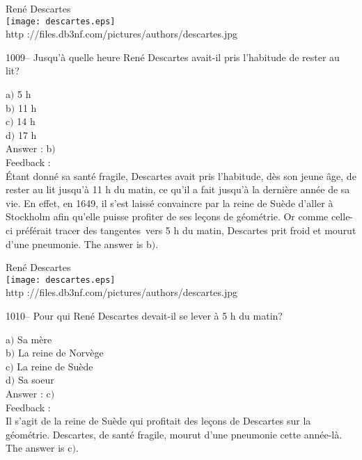 \documentclass[letterpaper, 12pt]{article}
\begin{document}
        \begin{center}
        Ren\'e Descartes\\
    \texttt{[image: descartes.eps]}\\
        {\footnotesize http
://files.db3nf.com/pictures/authors/descartes.jpg}
    \end{center}

1009-- Jusqu'\`a quelle heure Ren\'e Descartes avait-il pris
l'habitude de rester au lit?

a$)$ 5 h \\
b$)$ 11 h \\
c$)$ 14 h \\
d$)$ 17 h\\

Answer : b$)$\\

Feedback :\\
\'Etant donn\'e sa sant\'e fragile, Descartes avait pris l'habitude,
d\`es son jeune \^age, de rester au lit jusqu'\`a 11 h du matin, ce
qu'il a fait jusqu'\`a la derni\`ere ann\'ee de sa vie.  En effet,
en 1649, il s'est laiss\'e convaincre par la reine de Su\`ede
d'aller \`a Stockholm afin qu'elle puisse profiter de ses le\c cons
de g\'eom\'etrie.  Or comme celle-ci pr\'ef\'erait \og tracer des
tangentes\fg\ vers 5 h du matin, Descartes prit froid et mourut
d'une pneumonie.
The answer is b$)$.\\

        \begin{center}
        Ren\'e Descartes\\
    \texttt{[image: descartes.eps]}\\
        {\footnotesize http
://files.db3nf.com/pictures/authors/descartes.jpg}
    \end{center}

1010-- Pour qui Ren\'e Descartes devait-il se lever \`a 5 h du
matin?

a$)$ Sa m\`ere \\
b$)$ La reine de Norv\`ege \\
c$)$ La reine de Su\`ede \\
d$)$ Sa soeur\\

Answer : c$)$\\

Feedback : \\
Il s'agit de la reine de Su\`ede qui profitait des le\c cons de
Descartes sur la g\'eom\'etrie. Descartes, de sant\'e fragile,
mourut d'une pneumonie cette ann\'ee-l\`a.
The answer is c$)$.\\
\end{document}
